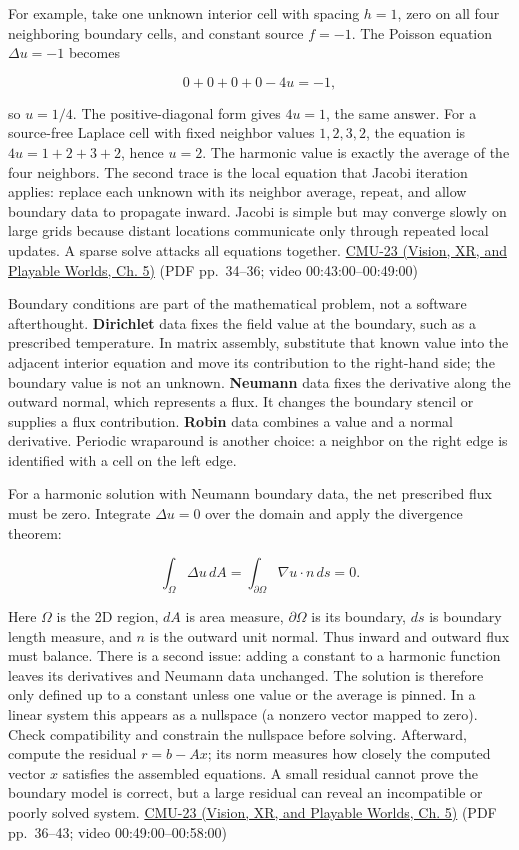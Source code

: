 For example, take one unknown interior cell with spacing \(h=1\), zero on all four neighboring boundary cells, and constant source \(f=-1\). The Poisson equation \(\Delta u=-1\) becomes

\[
0+0+0+0-4u=-1,
\]

so \(u=1/4\). The positive-diagonal form gives \(4u=1\), the same answer. For a source-free Laplace cell with fixed neighbor values \(1,2,3,2\), the equation is \(4u=1+2+3+2\), hence \(u=2\). The harmonic value is exactly the average of the four neighbors. The second trace is the local equation that Jacobi iteration applies: replace each unknown with its neighbor average, repeat, and allow boundary data to propagate inward. Jacobi is simple but may converge slowly on large grids because distant locations communicate only through repeated local updates. A sparse solve attacks all equations together. \href{../07-Vision-XR-and-Playable-Worlds/main.pdf\#nameddest=04-visual-computing-ii-ch036-cmu-23---physically-based-animation-and-pdes}{CMU-23 (Vision, XR, and Playable Worlds, Ch. 5)} (PDF pp.~34--36; video 00:43:00--00:49:00)

Boundary conditions are part of the mathematical problem, not a software afterthought. \textbf{Dirichlet} data fixes the field value at the boundary, such as a prescribed temperature. In matrix assembly, substitute that known value into the adjacent interior equation and move its contribution to the right-hand side; the boundary value is not an unknown. \textbf{Neumann} data fixes the derivative along the outward normal, which represents a flux. It changes the boundary stencil or supplies a flux contribution. \textbf{Robin} data combines a value and a normal derivative. Periodic wraparound is another choice: a neighbor on the right edge is identified with a cell on the left edge.

For a harmonic solution with Neumann boundary data, the net prescribed flux must be zero. Integrate \(\Delta u=0\) over the domain and apply the divergence theorem:

\[
\int_\Omega \Delta u\,dA
=\int_{\partial\Omega}\nabla u\cdot n\,ds
=0.
\]

Here \(\Omega\) is the 2D region, \(dA\) is area measure, \(\partial\Omega\) is its boundary, \(ds\) is boundary length measure, and \(n\) is the outward unit normal. Thus inward and outward flux must balance. There is a second issue: adding a constant to a harmonic function leaves its derivatives and Neumann data unchanged. The solution is therefore only defined up to a constant unless one value or the average is pinned. In a linear system this appears as a nullspace (a nonzero vector mapped to zero). Check compatibility and constrain the nullspace before solving. Afterward, compute the residual \(r=b-Ax\); its norm measures how closely the computed vector \(x\) satisfies the assembled equations. A small residual cannot prove the boundary model is correct, but a large residual can reveal an incompatible or poorly solved system. \href{../07-Vision-XR-and-Playable-Worlds/main.pdf\#nameddest=04-visual-computing-ii-ch036-cmu-23---physically-based-animation-and-pdes}{CMU-23 (Vision, XR, and Playable Worlds, Ch. 5)} (PDF pp.~36--43; video 00:49:00--00:58:00)


